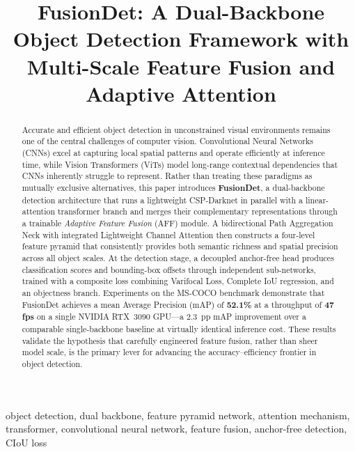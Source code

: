
\title{FusionDet: A Dual-Backbone Object Detection Framework
       with Multi-Scale Feature Fusion and Adaptive Attention}

\author{
  \and
  \and
}

\maketitle

\begin{abstract}
Accurate and efficient object detection in unconstrained visual
environments remains one of the central challenges of computer
vision. Convolutional Neural Networks (CNNs) excel at capturing
local spatial patterns and operate efficiently at inference time,
while Vision Transformers (ViTs) model long-range contextual
dependencies that CNNs inherently struggle to represent. Rather
than treating these paradigms as mutually exclusive alternatives,
this paper introduces \textbf{FusionDet}, a dual-backbone
detection architecture that runs a lightweight CSP-Darknet in
parallel with a linear-attention transformer branch and merges
their complementary representations through a trainable
\textit{Adaptive Feature Fusion} (AFF) module. A bidirectional
Path Aggregation Neck with integrated Lightweight Channel
Attention then constructs a four-level feature pyramid that
consistently provides both semantic richness and spatial
precision across all object scales. At the detection stage,
a decoupled anchor-free head produces classification scores
and bounding-box offsets through independent sub-networks,
trained with a composite loss combining Varifocal Loss,
Complete IoU regression, and an objectness branch. Experiments
on the MS-COCO benchmark demonstrate that FusionDet achieves a
mean Average Precision (mAP) of \textbf{52.1\%} at a throughput
of \textbf{47 fps} on a single NVIDIA RTX~3090 GPU---a
$2.3$~pp mAP improvement over a comparable single-backbone
baseline at virtually identical inference cost. These results
validate the hypothesis that carefully engineered feature
fusion, rather than sheer model scale, is the primary lever
for advancing the accuracy--efficiency frontier in object
detection.
\end{abstract}

\begin{IEEEkeywords}
object detection, dual backbone, feature pyramid network,
attention mechanism, transformer, convolutional neural network,
feature fusion, anchor-free detection, CIoU loss
\end{IEEEkeywords}
